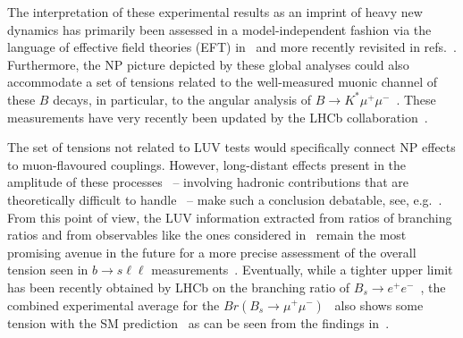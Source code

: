 The interpretation of these experimental results as an imprint of heavy new dynamics has primarily been assessed in a model-independent fashion via the language of effective field theories (EFT) in~\cite{DAmico:2017mtc,Geng:2017svp,Capdevila:2017bsm,Ciuchini:2017mik,Hiller:2017bzc} and more recently revisited in refs.~\cite{Ciuchini:2019usw,Aebischer:2019mlg,Alok:2019ufo,Alguero:2019ptt,Kowalska:2019ley,Arbey:2019duh,Datta:2019zca}. Furthermore, the NP picture depicted by these global analyses could also accommodate a set of tensions related to the well-measured muonic channel of these $B$ decays, in particular, to the angular analysis of $B \to K^{*} \mu^{+} \mu^{-}$~\cite{Descotes-Genon:2013wba,Descotes-Genon:2015uva}. These measurements have very recently been updated by the LHCb collaboration~\cite{Aaij:2020nrf}.

The set of tensions not related to LUV tests would specifically connect NP effects to muon-flavoured couplings. However, long-distant effects present in the amplitude of these processes~\cite{Khodjamirian:2010vf,Lyon:2014hpa,Chobanova:2017ghn,Blake:2017fyh,Bobeth:2017vxj} -- involving hadronic contributions that are theoretically difficult to handle~\cite{Jager:2014rwa,Ciuchini:2015qxb,Arbey:2018ics,Chrzaszcz:2018yza} -- make such a conclusion debatable, see, e.g.~\cite{Ciuchini:2018anp,Hurth:2020rzx}. From this point of view, the LUV information extracted from ratios of branching ratios and from observables like the ones considered in~\cite{Capdevila:2016ivx,Serra:2016ivr,Wehle:2016yoi,Alguero:2019pjc} remain the most promising avenue in the future for a more precise assessment of the overall tension seen in $b \to s \ell \ell$ measurements~\cite{Kou:2018nap}. Eventually, while a tighter upper limit has been recently obtained by LHCb on the branching ratio of $ B_{s} \to e^{+} e^{-}$~\cite{Aaij:2020nol}, the combined experimental average for the $ Br(B_{s} \to \mu^{+} \mu^{-}) $~\cite{Chatrchyan:2013bka,Aaij:2017vad,Aaboud:2018mst} also shows some tension with the SM prediction~\cite{Bobeth:2013uxa} as can be seen from the findings in~\cite{Ciuchini:2019usw,Aebischer:2019mlg}.

